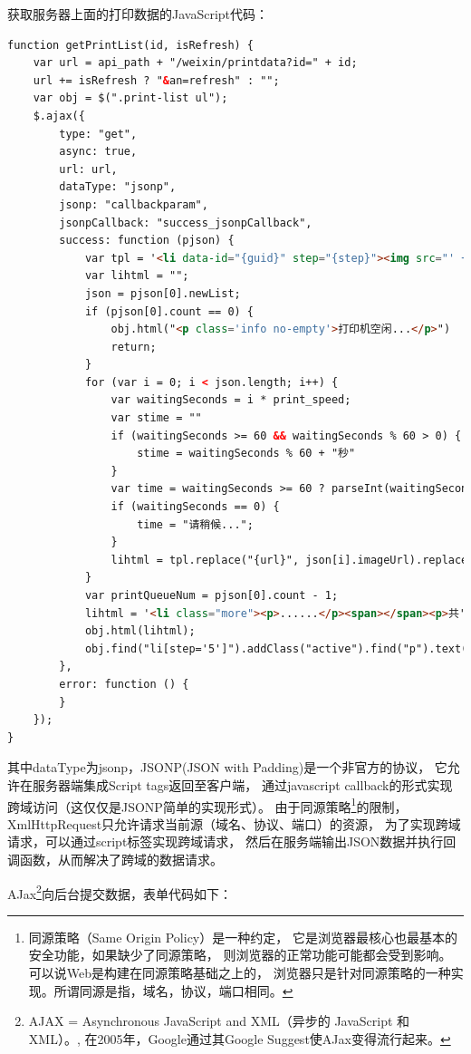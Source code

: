\documentclass{book}
\begin{document}
获取服务器上面的打印数据的JavaScript代码：

\begin{lstlisting}[language=HTML]
function getPrintList(id, isRefresh) {
	var url = api_path + "/weixin/printdata?id=" + id;
	url += isRefresh ? "&an=refresh" : "";
	var obj = $(".print-list ul");
	$.ajax({
	    type: "get",
	    async: true,
	    url: url,
	    dataType: "jsonp",
	    jsonp: "callbackparam",
	    jsonpCallback: "success_jsonpCallback",
	    success: function (pjson) {
	        var tpl = '<li data-id="{guid}" step="{step}"><img src="' + api_path + '{url}" /><span></span><p>{date}</p></li>';
	        var lihtml = "";
	        json = pjson[0].newList;
	        if (pjson[0].count == 0) {
	            obj.html("<p class='info no-empty'>打印机空闲...</p>")
	            return;
	        }
	        for (var i = 0; i < json.length; i++) {
	            var waitingSeconds = i * print_speed;
	            var stime = ""
	            if (waitingSeconds >= 60 && waitingSeconds % 60 > 0) {
	                stime = waitingSeconds % 60 + "秒"
	            }
	            var time = waitingSeconds >= 60 ? parseInt(waitingSeconds / 60) + "分" + stime + "后" : waitingSeconds + "秒后";
	            if (waitingSeconds == 0) {
	                time = "请稍候...";
	            }
	            lihtml = tpl.replace("{url}", json[i].imageUrl).replace("{date}", time).replace("{guid}", json[i].guid).replace("{step}", json[i].step) + lihtml;
	        }
	        var printQueueNum = pjson[0].count - 1;
	        lihtml = '<li class="more"><p>......</p><span></span><p>共' + printQueueNum + '人排队</p></li>' + lihtml;  
	        obj.html(lihtml);
	        obj.find("li[step='5']").addClass("active").find("p").text("正在打印...");
	    },
	    error: function () {
	    }
	});
}
\end{lstlisting}

其中dataType为jsonp，JSONP(JSON with Padding)是一个非官方的协议，
它允许在服务器端集成Script tags返回至客户端，
通过javascript callback的形式实现跨域访问（这仅仅是JSONP简单的实现形式）。
由于同源策略\footnote{同源策略（Same Origin Policy）是一种约定，
它是浏览器最核心也最基本的安全功能，如果缺少了同源策略，
则浏览器的正常功能可能都会受到影响。可以说Web是构建在同源策略基础之上的，
浏览器只是针对同源策略的一种实现。所谓同源是指，域名，协议，端口相同。}的限制，
XmlHttpRequest只允许请求当前源（域名、协议、端口）的资源，
为了实现跨域请求，可以通过script标签实现跨域请求，
然后在服务端输出JSON数据并执行回调函数，从而解决了跨域的数据请求。

AJax\footnote{AJAX = Asynchronous JavaScript and XML（异步的 JavaScript 和 XML）。,
在2005年，Google通过其Google Suggest使AJax变得流行起来。}向后台提交数据，表单代码如下：
\end{document}
